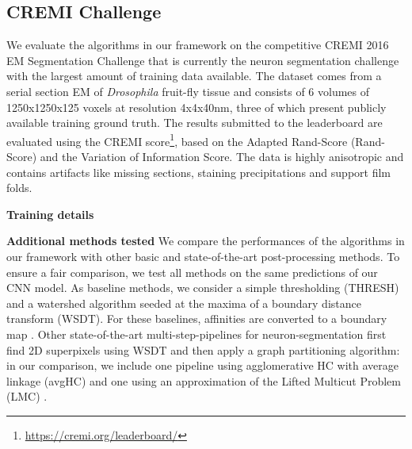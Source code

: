 \subsection{CREMI Challenge} \label{sec:cremi_challenge}
We evaluate the algorithms in our framework on the competitive CREMI 2016 EM Segmentation Challenge \cite{cremiChallenge} that is currently the neuron segmentation challenge with the largest amount of training data available. The dataset comes from a serial section EM of \emph{Drosophila} fruit-fly tissue and consists of 6 volumes of 1250x1250x125 voxels at resolution 4x4x40nm, three of which present publicly available training ground truth. The results submitted to the leaderboard are evaluated using the CREMI score\footnote{\url{https://cremi.org/leaderboard/}}, based on the Adapted Rand-Score (Rand-Score) and the Variation of Information Score\cite{arganda2015crowdsourcing}. The data is highly anisotropic and contains artifacts like missing sections, staining precipitations and support film folds. 

\textbf{Training details}  

\textbf{Additional methods tested }  We compare the performances of the algorithms in our framework with other basic and state-of-the-art post-processing methods. To ensure a fair comparison, we test all methods on the same predictions of our CNN model. As baseline methods, we consider a simple thresholding (THRESH) and a watershed algorithm seeded at the maxima of a boundary distance transform (WSDT). For these baselines, affinities are converted to a boundary map . Other state-of-the-art multi-step-pipelines for neuron-segmentation first find 2D superpixels using WSDT and then apply a graph partitioning algorithm: in our comparison, we include one pipeline using agglomerative HC with average linkage (avgHC) and one using an approximation of the Lifted Multicut Problem (LMC) \cite{beier2016efficient}.


